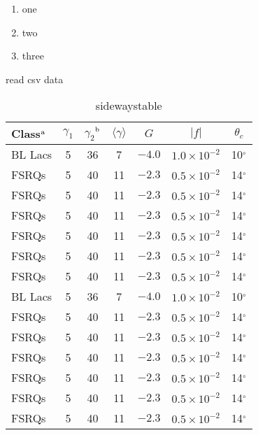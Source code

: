 \documentclass[
    writingLanguage=english, 
    addPageTitle=yes,
    AddDeclaration=yes,
    addMUSTlog=no,
    refUnindent=yes,
    printing=no,
]{.def/must}
\begin{document}
\begin{enumerate}
\item one
\item two
\item three
\end{enumerate}
\begin{table}[htbp]
    \centering
    \caption{read csv data}
    \label{tab:mytable}
\end{table}


\begin{sidewaystable}[!htp]
	\caption{sidewaystable} 
	\centering
	\setlength{\tabcolsep}{10mm}
	\begin{tabular}[l]{@{}lcccccc}		
	\toprule		
	Class$^{\rm a}$ & $\gamma_1$ & $\gamma_2$$^{\rm b}$& $\langle \gamma \rangle$& $G$ & $|{ f}|$ & $\theta _{c}$ \\		
	\midrule	
        BL Lacs &5 & 36 & 7 & $-4.0$ & $1.0\times 10^{-2}$ & 10$^\circ$ \\		
        FSRQs & 5 & 40 & 11 & $-2.3$ & $0.5\times 10^{-2}$ & 14$^\circ$ \\	
        FSRQs & 5 & 40 & 11 & $-2.3$ & $0.5\times 10^{-2}$ & 14$^\circ$ \\	
        FSRQs & 5 & 40 & 11 & $-2.3$ & $0.5\times 10^{-2}$ & 14$^\circ$ \\	
        FSRQs & 5 & 40 & 11 & $-2.3$ & $0.5\times 10^{-2}$ & 14$^\circ$ \\	
        FSRQs & 5 & 40 & 11 & $-2.3$ & $0.5\times 10^{-2}$ & 14$^\circ$ \\	
        FSRQs & 5 & 40 & 11 & $-2.3$ & $0.5\times 10^{-2}$ & 14$^\circ$ \\	
        BL Lacs &5 & 36 & 7 & $-4.0$ & $1.0\times 10^{-2}$ & 10$^\circ$ \\		
        FSRQs & 5 & 40 & 11 & $-2.3$ & $0.5\times 10^{-2}$ & 14$^\circ$ \\	
        FSRQs & 5 & 40 & 11 & $-2.3$ & $0.5\times 10^{-2}$ & 14$^\circ$ \\	
        FSRQs & 5 & 40 & 11 & $-2.3$ & $0.5\times 10^{-2}$ & 14$^\circ$ \\	
        FSRQs & 5 & 40 & 11 & $-2.3$ & $0.5\times 10^{-2}$ & 14$^\circ$ \\	
        FSRQs & 5 & 40 & 11 & $-2.3$ & $0.5\times 10^{-2}$ & 14$^\circ$ \\	
        FSRQs & 5 & 40 & 11 & $-2.3$ & $0.5\times 10^{-2}$ & 14$^\circ$ \\	
	\bottomrule		
\end{tabular}
\end{sidewaystable}
\end{document}
